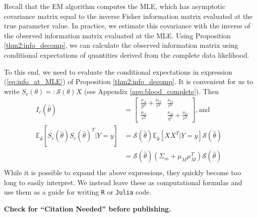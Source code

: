 \documentclass[11pt, oneside]{article}   	%
\newcommand{\bE}{\mathbb{E}}
\begin{document}
\begin{appendices}
    Recall that the EM algorithm computes the MLE, which has asymptotic covariance matrix equal to the inverse Fisher information matrix evaluated at the true parameter value. In practice, we estimate this covariance with the inverse of the observed information matrix evaluated at the MLE. Using Proposition \ref{thm2:info_decomp}, we can calculate the observed information matrix using conditional expectations of quantities derived from the complete data likelihood. 
    
    To this end, we need to evaluate the conditional expectations in expression (\ref{eq:info_at_MLE}) of Proposition \ref{thm2:info_decomp}. It is convenient for us to write $S_c(\theta) =: \mathscr{S}(\theta) X$ (see Appendix \ref{app:blood_complete}). Then 
    \begin{align}
        I_c(\hat{\theta}) &= \begin{bmatrix}
            \frac{\nu_A}{p^2} + \frac{\nu_O}{r^2} & \frac{\nu_O}{r^2}\\
            \frac{\nu_O}{r^2} & \frac{\nu_B}{q^2} + \frac{\nu_O}{r^2}
        \end{bmatrix} \mathrm{, and}\\
        \bE_{\hat{\theta}} [ S_c(\hat{\theta}) S_c(\hat{\theta})^T | Y=y] &= \mathscr{S}(\hat{\theta}) \bE_{\hat{\theta}} \left[ X X^T | Y=y \right] \mathscr{S}(\hat{\theta}) \\
        &= \mathscr{S}(\hat{\theta}) (\Sigma_m + \mu_M \mu_M^T) \mathscr{S}(\hat{\theta})\\
    \end{align}
    While it is possible to expand the above expressions, they quickly become too long to easily interpret. We instead leave these as computational formulas and use them as a guide for writing \texttt{R} or \texttt{Julia} code.

\end{appendices}

\newpage

\textbf{Check for ``Citation Needed'' before publishing.}



\end{document}
